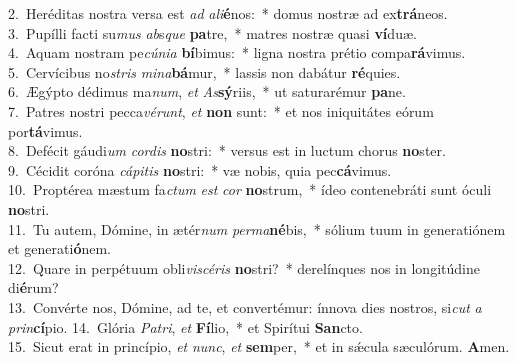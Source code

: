 {2.~}Heréditas nostra versa est \textit{ad} \textit{a}\textit{li}\textbf{é}nos:~* domus nostræ ad ex\textbf{trá}neos.\\
{3.~}Pupílli facti su\textit{mus} \textit{ab}s\textit{que} \textbf{pa}tre,~* matres nostræ quasi \textbf{ví}duæ.\\
{4.~}Aquam nostram pe\textit{cú}\textit{ni}\textit{a} \textbf{bí}bimus:~* ligna nostra prétio compa\textbf{rá}vimus.\\
{5.~}Cervícibus no\textit{stris} \textit{mi}\textit{na}\textbf{bá}mur,~* lassis non dabátur \textbf{ré}quies.\\
{6.~}Ægýpto dédimus ma\textit{num}, \textit{et} \textit{As}\textbf{sý}riis,~* ut saturarémur \textbf{pa}ne.\\
{7.~}Patres nostri pecca\textit{vé}\textit{runt}, \textit{et} \textbf{non} sunt:~* et nos iniquitátes eórum por\textbf{tá}vimus.\\
{8.~}Defécit gáudi\textit{um} \textit{cor}\textit{dis} \textbf{no}stri:~* versus est in luctum chorus \textbf{no}ster.\\
{9.~}Cécidit coróna \textit{cá}\textit{pi}\textit{tis} \textbf{no}stri:~* væ nobis, quia pec\textbf{cá}vimus.\\
{10.~}Proptérea mæstum fa\textit{ctum} \textit{est} \textit{cor} \textbf{no}strum,~* ídeo contenebráti sunt óculi \textbf{no}stri.\\
{11.~}Tu autem, Dómine, in ætér\textit{num} \textit{per}\textit{ma}\textbf{né}bis,~* sólium tuum in generatiónem et generati\textbf{ó}nem.\\
{12.~}Quare in perpétuum obli\textit{vi}\textit{scé}\textit{ris} \textbf{no}stri?~* derelínques nos in longitúdine di\textbf{é}rum?\\
{13.~}Convérte nos, Dómine, ad te, et convertémur: ínnova dies nostros, si\textit{cut} \textit{a} \textit{prin}\textbf{cí}pio.
{14.~}Glória \textit{Pa}\textit{tri}, \textit{et} \textbf{Fí}lio,~* et Spirítui \textbf{San}cto.\\
{15.~}Sicut erat in princípio, \textit{et} \textit{nunc}, \textit{et} \textbf{sem}per,~* et in sǽcula sæculórum. \textbf{A}men.\\
